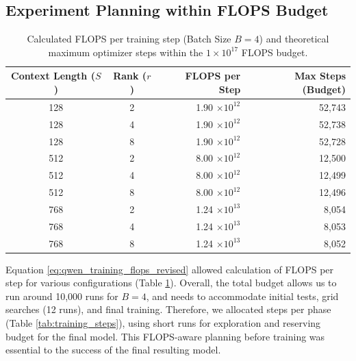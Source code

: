 \documentclass{article}
\begin{document}
\subsection{Experiment Planning within FLOPS Budget}



\begin{table}[!htbp]
\renewcommand{\arraystretch}{1.4} \centering \setlength{\tabcolsep}{8pt}
\begin{tabular}{@{}ccrr@{}}
    \toprule \textbf{Context Length ($S$)} & \textbf{Rank ($r$)} & \textbf{FLOPS per Step} & \textbf{Max Steps (Budget)} \\ \midrule
    128 & 2 &  1.90 $\times 10^{12}$ & 52,743 \\
    128 & 4 &  1.90 $\times 10^{12}$ & 52,738 \\
    128 & 8 &  1.90 $\times 10^{12}$ & 52,728 \\ \midrule
    512 & 2 &  8.00 $\times 10^{12}$ & 12,500 \\
    512 & 4 &  8.00 $\times 10^{12}$ & 12,499 \\
    512 & 8 &  8.00 $\times 10^{12}$ & 12,496 \\ \midrule
    768 & 2 & 1.24 $\times 10^{13}$ & 8,054 \\
    768 & 4 & 1.24 $\times 10^{13}$ & 8,053 \\
    768 & 8 & 1.24 $\times 10^{13}$ & 8,052 \\
    \bottomrule
\end{tabular}
\caption{Calculated FLOPS per training step (Batch Size $B=4$) and theoretical maximum optimizer steps within the $1 \times 10^{17}$ FLOPS budget.} \label{tab:flops_vs_steps}
\end{table}

Equation \ref{eq:qwen_training_flops_revised} allowed calculation of FLOPS per step for various configurations (Table \ref{tab:flops_vs_steps}).
Overall, the total budget allows us to run around 10,000 runs for $B=4$, and needs to accommodate initial tests, grid searches (12 runs), and final training. Therefore, we allocated steps per phase (Table \ref{tab:training_steps}), using short runs for exploration and reserving budget for the final model. This FLOPS-aware planning before training was essential to the success of the final resulting model.
\end{document}
